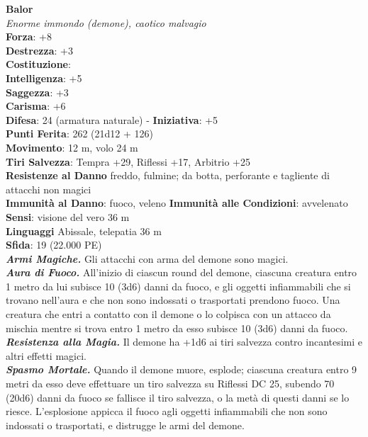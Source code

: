 \begin{multicols}{2}
\medskip\textbf{Balor}\\
\emph{Enorme immondo (demone), caotico malvagio}\\
\textbf{Forza}: +8\\
\textbf{Destrezza}: +3\\
\textbf{Costituzione}: \\\textbf{Intelligenza}: +5\\
\textbf{Saggezza}: +3\\
\textbf{Carisma}: +6\\
\textbf{Difesa}: 24 (armatura naturale) - \textbf{Iniziativa}: +5\\
\textbf{Punti Ferita}: 262 (21d12 + 126)\\
\textbf{Movimento}: 12 m, volo 24 m\\
\textbf{Tiri Salvezza}: Tempra +29, Riflessi +17, Arbitrio +25\\
\textbf{Resistenze al Danno} freddo, fulmine; da botta, perforante e tagliente di attacchi non magici\\ 
\textbf{Immunità al Danno}: fuoco, veleno \textbf{Immunità alle Condizioni}: avvelenato\\
\textbf{Sensi}: visione del vero 36 m\\
\textbf{Linguaggi} Abissale, telepatia 36 m\\
\textbf{Sfida}: 19 (22.000 PE)\smallskip\\
\emph{\textbf{Armi Magiche.}} Gli attacchi con arma del demone sono magici.\\
\emph{\textbf{Aura di Fuoco.}} All'inizio di ciascun round del demone, ciascuna creatura entro 1 metro da lui subisce 10 (3d6) danni da fuoco, e gli oggetti infiammabili che si trovano nell'aura e che non sono indossati o trasportati prendono fuoco. Una creatura che entri a contatto con il demone o lo colpisca con un attacco da mischia mentre si trova entro 1 metro da esso subisce 10 (3d6) danni da fuoco.\\
\emph{\textbf{Resistenza alla Magia.}} Il demone ha +1d6 ai tiri salvezza contro incantesimi e altri effetti magici.\\
\emph{\textbf{Spasmo Mortale.}} Quando il demone muore, esplode; ciascuna creatura entro 9 metri da esso deve effettuare un tiro salvezza su Riflessi DC  25, subendo 70 (20d6) danni da fuoco se fallisce il tiro salvezza, o la metà di questi danni se lo riesce. L'esplosione appicca il fuoco agli oggetti infiammabili che non sono indossati o trasportati, e distrugge le armi del demone. \\

\end{multicols}

